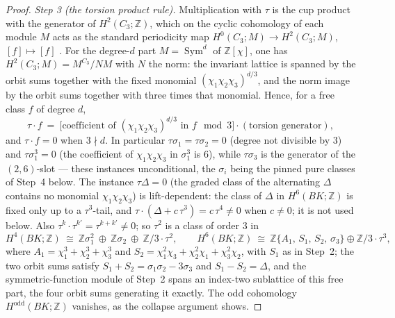 \documentclass[11pt,a4paper]{article}
\begin{document}
\begin{proof}
\emph{Step 3 (the torsion product rule).} Multiplication with $\tau$ is the
cup product with the generator of $H^2(C_3;\mathbb Z)$, which on the cyclic
cohomology of each module $M$ acts as the standard periodicity map
$H^0(C_3;M)\to H^2(C_3;M)$, $[f]\mapsto[f]$ \cite{Brown1982}. For the
degree-$d$ part $M=\operatorname{Sym}^d$ of $\mathbb Z[\chi]$, one has
$H^2(C_3;M)=M^{C_3}/NM$ with $N$ the norm: the invariant lattice is spanned
by the orbit sums together with the fixed monomial
$(\chi_1\chi_2\chi_3)^{d/3}$, and the norm image by the orbit sums together
with three times that monomial. Hence, for a free class $f$ of degree $d$,
\[
\tau\cdot f\ =\ \bigl[\text{coefficient of }(\chi_1\chi_2\chi_3)^{d/3}
\text{ in }f\ \bmod 3\bigr]\cdot(\text{torsion generator}),
\]
and $\tau\cdot f=0$ when $3\nmid d$. In particular $\tau\sigma_1=
\tau\sigma_2=0$ (degree not divisible by $3$) and
$\tau\sigma_1^3=0$ (the coefficient of
$\chi_1\chi_2\chi_3$ in $\sigma_1^3$ is $6$), while $\tau\sigma_3$ is the
generator of the $(2,6)$-slot --- these instances unconditional, the
$\sigma_i$ being the pinned pure classes of Step~4 below. The instance
$\tau\Delta=0$ (the graded class of the alternating $\Delta$ contains no
monomial $\chi_1\chi_2\chi_3$) is lift-dependent: the class of $\Delta$ in
$H^6(BK;\mathbb Z)$ is fixed only up to a $\tau^3$-tail, and
$\tau\cdot(\Delta+c\,\tau^3)=c\,\tau^4\ne0$ when $c\ne0$; it is not used
below. Also $\tau^k\cdot\tau^{k'}=\tau^{k+k'}\ne0$;
so $\tau^2$ is a class of order $3$ in
\[
H^4(BK;\mathbb Z)\ \cong\ \mathbb Z\sigma_1^2\ \oplus\ \mathbb Z\sigma_2\
\oplus\ \mathbb Z/3\cdot\tau^2,
\qquad
H^6(BK;\mathbb Z)\ \cong\ \mathbb Z\{A_1,\,S_1,\,S_2,\,\sigma_3\}\oplus
\mathbb Z/3\cdot\tau^3,
\]
where $A_1=\chi_1^3+\chi_2^3+\chi_3^3$ and
$S_2=\chi_1^2\chi_3+\chi_2^2\chi_1+\chi_3^2\chi_2$, with $S_1$ as in
Step~2; the two orbit sums satisfy $S_1+S_2=\sigma_1\sigma_2-3\sigma_3$ and
$S_1-S_2=\Delta$, and the symmetric-function module of Step~2 spans an
index-two sublattice of this free part, the four orbit sums generating it
exactly. The odd cohomology $H^{\mathrm{odd}}(BK;\mathbb Z)$ vanishes, as the
collapse argument shows.


\end{proof}
\end{document}
